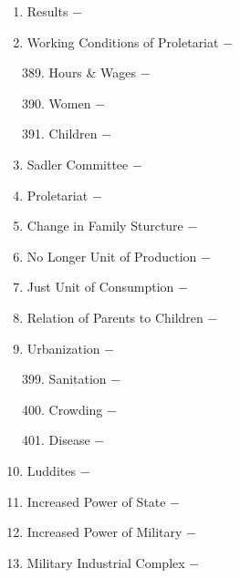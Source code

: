\documentclass[12pt]{article}
\begin{document}
\begin{enumerate}
\item Results $-$ 

\item Working Conditions of Proletariat $-$ 

\begin{enumerate}[label=\arabic{*}.]
\setcounter{enumii}{388}

\item Hours \& Wages $-$

\item Women $-$

\item Children $-$ 


\end{enumerate}
\setcounter{enumi}{391}

\item Sadler Committee $-$ 

\item Proletariat $-$ 

\item Change in Family Sturcture $-$ 

\item No Longer Unit of Production $-$ 

\item Just Unit of Consumption $-$ 

\item Relation of Parents to Children $-$ 

\item Urbanization $-$ 

\begin{enumerate}[label=\arabic{*}.]
\setcounter{enumii}{398}

\item Sanitation $-$

\item Crowding $-$

\item Disease $-$ 


\end{enumerate}
\setcounter{enumi}{401}

\item Luddites $-$ 

\item Increased Power of State $-$ 

\item Increased Power of Military $-$ 

\item Military Industrial Complex $-$ 


\end{enumerate}
\end{document}
